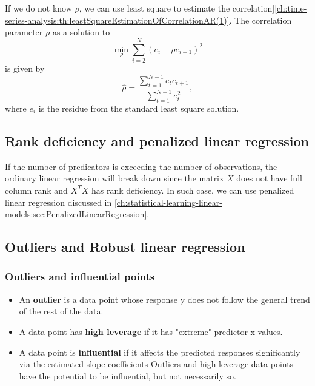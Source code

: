 \begin{refsection}
\begin{remark}
\begin{itemize}
\end{itemize}	
	
	
\end{remark}



\begin{remark}\cite[254]{theil1971principles}
If we do not know $\rho$, we can use least square to estimate  the correlation]\autoref{ch:time-series-analysis:th:leastSquareEstimationOfCorrelationAR(1)}.
		The correlation parameter $\rho$ as a solution to	
		$$\min_{\rho} \sum_{i=2}^N (e_i - \rho e_{i-1})^2$$
		is given by
		$$\hat{\rho} = \frac{\sum_{t=1}^{N-1} e_t e_{t+1}}{\sum_{t=1}^{N-1} e_t^2},$$
		where $e_i$ is the residue from the standard least square solution.	
\end{remark}



\subsection{Rank deficiency and penalized linear regression}

If the number of predicators is exceeding the number of observations, the ordinary linear regression will break down since the matrix $X$ does not have full column rank and $X^TX$ has rank deficiency. In such case, we can use penalized linear regression discussed in \autoref{ch:statistical-learning-linear-models:sec:PenalizedLinearRegression}.

\subsection{Outliers and Robust linear regression}

\subsubsection{Outliers and influential points}

\begin{definition}\hfill
\begin{itemize}
	\item An \textbf{outlier} is a data point whose response y does not follow the general trend of the rest of the data.
	\item A data point has \textbf{high leverage} if it has "extreme" predictor x values.
	\item A data point is \textbf{influential} if it affects the predicted responses significantly via the estimated slope coefficients Outliers and high leverage data points have the potential to be influential, but not necessarily so.
\end{itemize}	
\end{definition}



\end{refsection}
